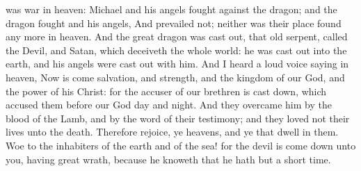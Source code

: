  was war in heaven: Michael and his angels fought against the dragon; and the dragon fought and his angels, And prevailed not; neither was their place found any more in heaven. And the great dragon was cast out, that old serpent, called the Devil, and Satan, which deceiveth the whole world: he was cast out into the earth, and his angels were cast out with him. And I heard a loud voice saying in heaven, Now is come salvation, and strength, and the kingdom of our God, and the power of his Christ: for the accuser of our brethren is cast down, which accused them before our God day and night. And they overcame him by the blood of the Lamb, and by the word of their testimony; and they loved not their lives unto the death. Therefore rejoice, ye heavens, and ye that dwell in them. Woe to the inhabiters of the earth and of the sea! for the devil is come down unto you, having great wrath, because he knoweth that he hath but a short time.


